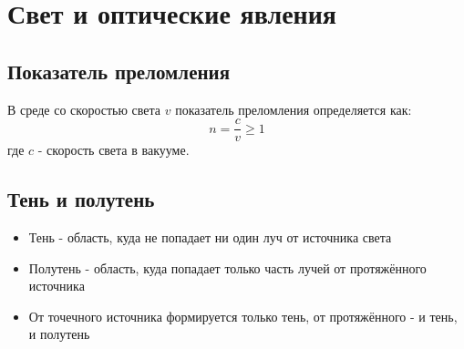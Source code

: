 \documentclass[12pt]{article}
\begin{document}
\section*{Свет и оптические явления}

\subsection*{Показатель преломления}
В среде со скоростью света $v$ показатель преломления определяется как:
\[
n = \frac{c}{v} \ge 1
\]
где $c$ - скорость света в вакууме.

\subsection*{Тень и полутень}
\begin{itemize}
\item Тень - область, куда не попадает ни один луч от источника света
\item Полутень - область, куда попадает только часть лучей от протяжённого источника
\item От точечного источника формируется только тень, от протяжённого - и тень, и полутень
\end{itemize}
\end{document}
